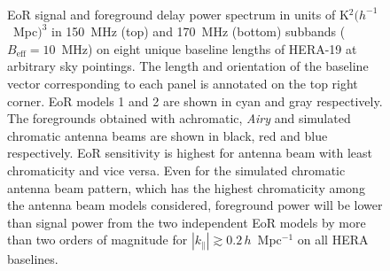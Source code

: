 \documentclass[preprint2,iop,numberedappendix,twocolappendix,appendixfloats]{emulateapj}
\begin{document}
\begin{figure}[htb]
\centering
{} \\
\caption{EoR signal and foreground delay power spectrum in units of K$^2 (h^{-1}$~Mpc$)^3$ in 150~MHz (top) and 170~MHz (bottom) subbands ($B_\textrm{eff}=10$~MHz) on eight unique baseline lengths of HERA-19 at arbitrary sky pointings. The length and orientation of the baseline vector corresponding to each panel is annotated on the top right corner. EoR models 1 and 2 are shown in cyan and gray respectively. The foregrounds obtained with achromatic, {\it Airy} and simulated chromatic antenna beams are shown in black, red and blue respectively. EoR sensitivity is highest for antenna beam with least chromaticity and vice versa. Even for the simulated chromatic antenna beam pattern, which has the highest chromaticity among the antenna beam models considered, foreground power will be lower than signal power from the two independent EoR models by more than two orders of magnitude for $|k_\parallel| \gtrsim 0.2\,h$~Mpc$^{-1}$ on all HERA baselines.}
\label{fig:subbands}
\end{figure}
\end{document}
